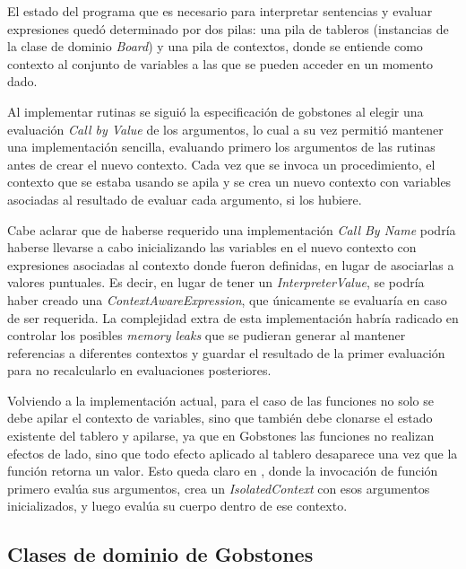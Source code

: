 El estado del programa que es necesario para interpretar sentencias y evaluar expresiones quedó determinado por dos pilas: una pila de tableros (instancias de la clase de dominio \textit{Board}) y una pila de contextos, donde se entiende como contexto al conjunto de variables a las que se pueden acceder en un momento dado.

Al implementar rutinas se siguió la especificación de gobstones al elegir una evaluación \textit{Call by Value} \cite{DowekL11} de los argumentos, lo cual a su vez permitió mantener una implementación sencilla, evaluando primero los argumentos de las rutinas antes de crear el nuevo contexto. 
Cada vez que se invoca un procedimiento, el contexto que se estaba usando se apila y se crea un nuevo contexto con variables asociadas al resultado de evaluar cada argumento, si los hubiere. 

Cabe aclarar que de haberse requerido una implementación \textit{Call By Name} podría haberse llevarse a cabo inicializando las variables en el nuevo contexto con expresiones asociadas al contexto donde fueron definidas, en lugar de asociarlas a valores puntuales. Es decir, en lugar de tener un \textit{InterpreterValue}, se podría haber creado una \textit{ContextAwareExpression}, que únicamente se evaluaría en caso de ser requerida. La complejidad extra de esta implementación habría radicado en controlar los posibles \textit{memory leaks} que se pudieran generar al mantener referencias a diferentes contextos y guardar el resultado de la primer evaluación para no recalcularlo en evaluaciones posteriores.

Volviendo a la implementación actual, para el caso de las funciones no solo se debe apilar el contexto de variables, sino que también debe clonarse el estado existente del tablero y apilarse, ya que en Gobstones las funciones no realizan efectos de lado, sino que todo efecto aplicado al tablero desaparece una vez que la función retorna un valor. Esto queda claro en , donde la invocación de función primero evalúa sus argumentos, crea un \textit{IsolatedContext} con esos argumentos inicializados, y luego evalúa su cuerpo dentro de ese contexto.


\subsection{Clases de dominio de Gobstones}

